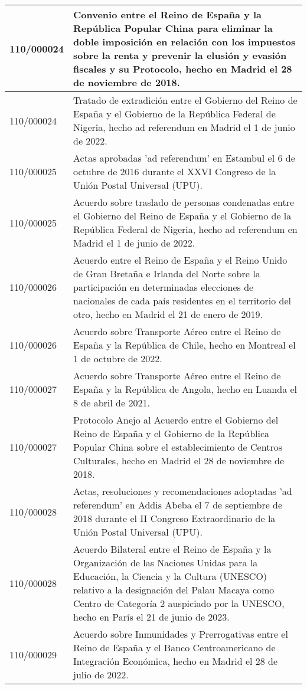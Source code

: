 {\begin{table}[H]
\begin{center}
\begin{tabularx}{\linewidth}{| l | X |}
\hline
110/000024 & Convenio entre el Reino de España y la República Popular China para eliminar la doble imposición en relación con los impuestos sobre la renta y prevenir la elusión y evasión fiscales y su Protocolo, hecho en Madrid el 28 de noviembre de 2018. \\
\hline
110/000024 & Tratado de extradición entre el Gobierno del Reino de España y el Gobierno de la República Federal de Nigeria, hecho ad referendum en Madrid el 1 de junio de 2022. \\
\hline
110/000025 & Actas aprobadas 'ad referendum' en Estambul el 6 de octubre de 2016 durante el XXVI Congreso de la Unión Postal Universal (UPU). \\
\hline
110/000025 & Acuerdo sobre traslado de personas condenadas entre el Gobierno del Reino de España y el Gobierno de la República Federal de Nigeria, hecho ad referendum en Madrid el 1 de junio de 2022. \\
\hline
110/000026 & Acuerdo entre el Reino de España y el Reino Unido de Gran Bretaña e Irlanda del Norte sobre la participación en determinadas elecciones de nacionales de cada país residentes en el territorio del otro, hecho en Madrid el 21 de enero de 2019. \\
\hline
110/000026 & Acuerdo sobre Transporte Aéreo entre el Reino de España y la República de Chile, hecho en Montreal el 1 de octubre de 2022. \\
\hline
110/000027 & Acuerdo sobre Transporte Aéreo entre el Reino de España y la República de Angola, hecho en Luanda el 8 de abril de 2021. \\
\hline
110/000027 & Protocolo Anejo al Acuerdo entre el Gobierno del Reino de España y el Gobierno de la República Popular China sobre el establecimiento de Centros Culturales, hecho en Madrid el 28 de noviembre de 2018. \\
\hline
110/000028 & Actas, resoluciones y recomendaciones adoptadas 'ad referendum' en Addis Abeba el 7 de septiembre de 2018 durante el II Congreso Extraordinario de la Unión Postal Universal (UPU). \\
\hline
110/000028 & Acuerdo Bilateral entre el Reino de España y la Organización de las Naciones Unidas para la Educación, la Ciencia y la Cultura (UNESCO) relativo a la designación del Palau Macaya como Centro de Categoría 2 auspiciado por la UNESCO, hecho en París el 21 de junio de 2023. \\
\hline
110/000029 & Acuerdo sobre Inmunidades y Prerrogativas entre el Reino de España y el Banco Centroamericano de Integración Económica, hecho en Madrid el 28 de julio de 2022. \\

\end{tabularx}
\end{center}
\end{table}}
